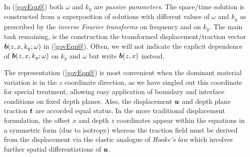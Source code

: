 \documentclass[11pt]{article}
\newcommand{\bmi}[1]{\mbox{\boldmath$\mit #1$\unboldmath}}
\begin{document}
In (\ref{govEqn0}) both $\omega$ and ${  k}_{  y}$ are {\em passive
parameters\/}. The space/time solution is constructed from a
superposition of solutions with different values of $\omega$ and ${  k}_{  y}$
as prescribed by the {\em inverse Fourier transforms\/}
on frequency and on $k_y$. The main task remaining, is the construction the
transformed displacement/traction vector ${\bmi  b }(z,x,k_y; \omega)$ in (\ref{govEqn0}).
Often, we will not indicate the explicit dependence of  ${\bmi  b }(z,x,k_y; \omega)$
on $k_y$ and $\omega$ but write ${\bmi  b }(z,x)$ instead.

The representation (\ref{govEqn0}) is most convenient when the
dominant material variation is in the $z$ coordinate direction, as we have
singled out this coordinate for special treatment, allowing easy application of
boundary and interface conditions on fixed depth planes.  Also, the
displacement ${\bmi  u}$ and depth plane traction ${\bmi  t}$ are accorded equal status.
In the more traditional displacement formulation, the  offset $x$ and depth $z$
coordinates appear within the equations in a symmetric form (due to isotropy)
whereas the traction field must be derived from the displacement via the
elastic analogue of {\em Hooke's law\/} which involves further spatial
differentiations of $\bmi  u$.
\end{document}
